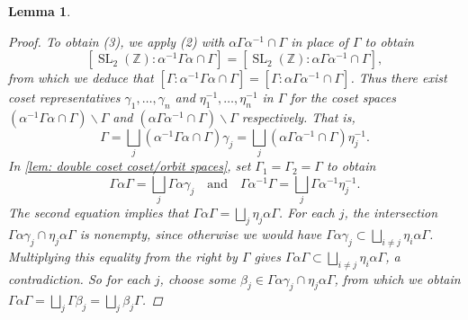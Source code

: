 \documentclass[10pt,leqno,twoside]{article}
\theoremstyle{plain}
\newtheorem{lemma}[lem]{Lemma}
\theoremstyle{definition}
\numberwithin{equation}{section}
\numberwithin{lem}{section}
\DeclareMathOperator{\SL}{SL}
\newcommand{\slz}{\SL_2(\mathbb{Z})}
\begin{document}
\begin{lemma}
\begin{proof}
        To obtain (3), we apply (2) with $\alpha\varGamma\alpha^{-1}\cap \varGamma$ in place of $\varGamma$ to obtain 
        \[[\slz : \alpha^{-1}\varGamma\alpha\cap \varGamma] = [\slz : \alpha\varGamma\alpha^{-1}\cap\varGamma],\] from which we deduce that $[\varGamma : \alpha^{-1}\varGamma\alpha\cap \varGamma] = [\varGamma : \alpha\varGamma\alpha^{-1}\cap\varGamma]$. Thus there exist coset representatives $\gamma_1,\dots,\gamma_n$ and $\eta^{-1}_1,\dots,\eta^{-1}_n$ in $\varGamma$ for the coset spaces $(\alpha^{-1}\varGamma\alpha\cap \varGamma)\backslash\varGamma$ and $(\alpha\varGamma\alpha^{-1}\cap \varGamma)\backslash\varGamma$ respectively. That is, 
        \[\varGamma = \bigsqcup_j(\alpha^{-1}\varGamma\alpha\cap \varGamma)\gamma_j = \bigsqcup_j(\alpha\varGamma\alpha^{-1}\cap \varGamma)\eta_j^{-1}.\]
        In \cref{lem: double coset coset/orbit spaces}, set $\varGamma_1 = \varGamma_2 = \varGamma$ to obtain 
        \[\varGamma\alpha\varGamma = \bigsqcup_j\varGamma\alpha\gamma_j\quad\text{and}\quad \varGamma\alpha^{-1}\varGamma = \bigsqcup_j \varGamma\alpha^{-1}\eta^{-1}_j.\] The second equation implies that $\varGamma\alpha\varGamma = \bigsqcup_j\eta_j\alpha\varGamma$. For each $j$, the intersection $\varGamma\alpha\gamma_j\cap\eta_j\alpha\varGamma$ is nonempty, since otherwise we would have $\varGamma\alpha\gamma_j\subset\bigsqcup_{i\neq j}\eta_i\alpha\varGamma$. Multiplying this equality from the right by $\varGamma$ gives $\varGamma\alpha\varGamma\subset \bigsqcup_{i\neq j}\eta_i\alpha\varGamma$, a contradiction. So for each $j$, choose some $\beta_j\in \varGamma\alpha\gamma_j\cap\eta_j\alpha\varGamma$, from which we obtain $\varGamma\alpha\varGamma = \bigsqcup_j\varGamma \beta_j = \bigsqcup_j\beta_j\varGamma$.
    \end{proof}
\end{lemma}
\end{document}
